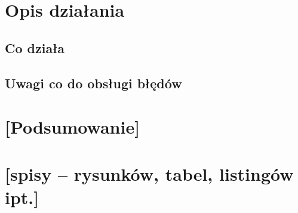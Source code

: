 \documentclass{article}
\begin{document}
\section{Opis działania}
\subsection{Co działa}
\subsection{Uwagi co do obsługi błędów}
\section{[Podsumowanie]}
\section{[spisy -- rysunków, tabel, listingów ipt.]}



\end{document}
